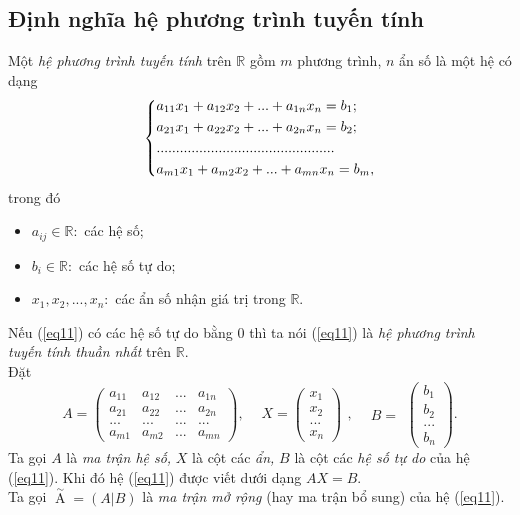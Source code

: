 \subsection{Định nghĩa hệ phương trình tuyến tính}
Một \textit{hệ phương trình tuyến tính} trên $\mathbb{R}$ gồm $m$ phương trình, $n$ ẩn số là một hệ có dạng
\begin{equation}
\left\{ \begin{gathered}
  {a_{11}}{x_1} + {a_{12}}{x_2} + ... + {a_{1n}}{x_n} = {b_1}; \hfill \\
  {a_{21}}{x_1} + {a_{22}}{x_2} + ... + {a_{2n}}{x_n} = {b_2}; \hfill \\
  .............................................. \hfill \\
  {a_{m1}}{x_1} + {a_{m2}}{x_2} + ... + {a_{mn}}{x_n} = {b_m}, \hfill \\ 
\end{gathered}  \right.
\label{eq11}
\end{equation}
trong đó
\begin{itemize}
\item $a_{ij} \in \mathbb{R}:$ các hệ số;
\item $b_i \in \mathbb{R}:$ các hệ số tự do;
\item $x_1, x_2, ..., x_n:$ các ẩn số nhận giá trị trong $\mathbb{R}.$
\end{itemize}
Nếu (\ref{eq11}) có các hệ số tự do bằng $0$ thì ta nói (\ref{eq11}) là \textit{hệ phương trình tuyến tính thuần nhất} trên $\mathbb{R}.$\\
Đặt $$A = \left( {\begin{array}{*{20}{c}}
  {{a_{11}}}&{{a_{12}}}&{...}&{{a_{1n}}} \\ 
  {{a_{21}}}&{{a_{22}}}&{...}&{{a_{2n}}} \\ 
  {...}&{...}&{...}&{...} \\ 
  {{a_{m1}}}&{{a_{m2}}}&{...}&{{a_{mn}}} 
\end{array}} \right),\begin{array}{*{20}{c}}
  {}&{X = \left( {\begin{array}{*{20}{c}}
  {{x_1}} \\ 
  {{x_2}} \\ 
  {...} \\ 
  {{x_n}} 
\end{array}} \right)} 
\end{array},\begin{array}{*{20}{c}}
  {}&{B = } 
\end{array}\left( {\begin{array}{*{20}{c}}
  {{b_1}} \\ 
  {{b_2}} \\ 
  {...} \\ 
  {{b_n}} 
\end{array}} \right).$$
Ta gọi $A$ là \textit{ma trận hệ số,} $X$ là cột các \textit{ẩn,} $B$ là cột các \textit{hệ số tự do} của hệ (\ref{eq11}). Khi đó hệ (\ref{eq11}) được viết dưới dạng $AX = B.$\\
Ta gọi $\mathop A\limits^ \sim   = \left( {\left. A \right|B} \right)$ là \textit{ma trận mở rộng} (hay ma trận bổ sung) của hệ (\ref{eq11}).
